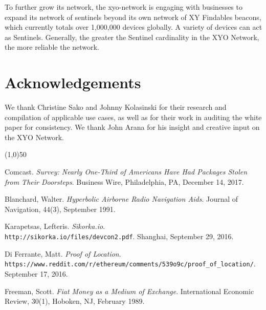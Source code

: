\documentclass{article}
\begin{document}
To further grow its network, the \Gls{xyo-network} is engaging with businesses to expand its network of \Glspl{sentinel} beyond its own network of XY Findables beacons, which currently totals over 1,000,000 devices globally. A variety of devices can act as Sentinels. Generally, the greater the Sentinel cardinality in the XYO Network, the more reliable the network.


\section {Acknowledgements}

We thank Christine Sako and Johnny Kolasinski for their research and compilation of applicable use cases, as well as for their work in auditing the white paper for consistency. We  thank John Arana for his insight and creative input on the XYO Network.


\begin{center}
\line(1,0){50}
\end{center}



\begin{thebibliography}{9}

Comcast.
\textit{Survey: Nearly One-Third of Americans Have Had Packages Stolen from Their Doorsteps}.
Business Wire, Philadelphia, PA, December 14, 2017.

Blanchard, Walter.
\textit{Hyperbolic Airborne Radio Navigation Aids}.
Journal of Navigation, 44(3), September 1991.

Karapetsas, Lefteris.
\textit{Sikorka.io}.
\\\texttt{http://sikorka.io/files/devcon2.pdf}.
Shanghai, September 29, 2016.

Di Ferrante, Matt.
\textit{Proof of Location}.
\\\texttt{https://www.reddit.com/r/ethereum/comments/539o9c/proof\_of\_location/}.
September 17, 2016.

Freeman, Scott.
\textit{Fiat Money as a Medium of Exchange}.
International Economic Review, 30(1), Hoboken, NJ, February 1989.
\end{thebibliography}

\clearpage

\printglossaries

\end{document}
